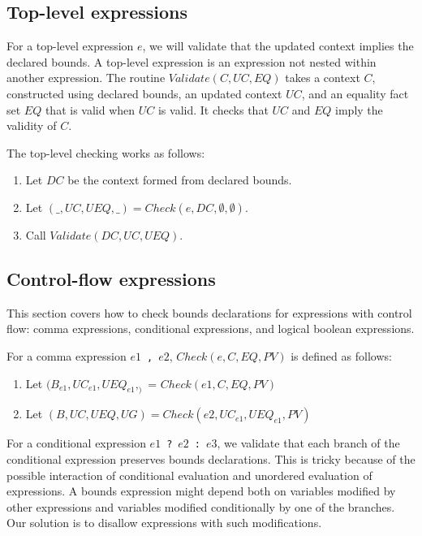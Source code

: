 \subsection{Top-level expressions}

For a top-level expression $e$, we will validate that the updated context implies the declared bounds.
A top-level expression is an expression not nested within another expression.
The routine $Validate(C, UC, EQ)$ takes a context $C$,
constructed using declared bounds, an updated context $UC$, and an equality fact set $EQ$
that is valid when $UC$ is valid.  It checks that $UC$ and $EQ$ imply the validity of $C$.

The top-level checking works as follows:
\begin{enumerate}
\item Let $DC$ be the context formed from declared bounds.
\item Let $(\_, UC, UEQ, \_) = Check(e, DC, \emptyset, \emptyset)$.
\item Call $Validate(DC, UC, UEQ)$.
\end{enumerate}

\subsection{Control-flow expressions}

This section covers how to check bounds declarations for expressions
with control flow: comma expressions, conditional expressions, and 
logical boolean expressions.

For a comma expression $e1$~\lstinline|,|~$e2$, $Check(e, C, EQ, PV)$ is defined as follows:
\begin{enumerate}
\item Let $(B_{e1}, {UC}_{e1}, {UEQ}_{e1}, _)$ = $Check(e1, C, EQ, PV)$
\item Let $(B, UC, UEQ, UG) = Check(e2, {UC}_{e1}, {UEQ}_{e1}, PV)$
\end{enumerate}

For a conditional expression $e1$~\lstinline+?+~$e2$~\lstinline+:+~$e3$, we validate that each branch
of the conditional expression preserves bounds declarations.  This is tricky
because of the possible interaction of conditional evaluation and unordered evaluation
of expressions.  A bounds expression might depend both on variables modified 
by other expressions and variables modified conditionally by one of the
branches.  Our solution is to disallow expressions with such modifications.

